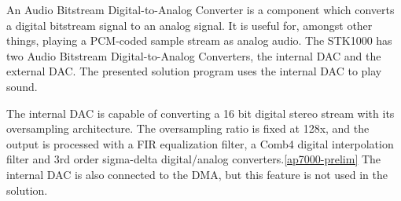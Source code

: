 An Audio Bitstream Digital-to-Analog Converter is a component which converts a digital bitstream signal to an analog signal.
It is useful for, amongst other things, playing a PCM-coded sample stream as analog audio.
The STK1000 has two Audio Bitstream Digital-to-Analog Converters, the internal DAC and the external DAC.
The presented solution program uses the internal DAC to play sound.

The internal DAC is capable of converting a 16 bit digital stereo stream with its oversampling architecture. The oversampling ratio is fixed at 128x, and the output is processed with a FIR equalization filter, a Comb4 digital interpolation filter and 3rd order sigma-delta digital/analog converters.\ref{ap7000-prelim}
The internal DAC is also connected to the DMA, but this feature is not used in the solution.
